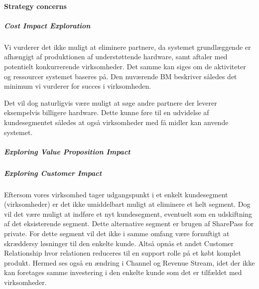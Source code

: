 \paragraph{Strategy concerns}

\subparagraph{Cost Impact Exploration}
Vi vurderer det ikke muligt at eliminere partnere, da systemet grundlæggende er afhængigt af produktionen af understøttende hardware, samt aftaler med potentielt konkurrerende virksomheder.
Det samme kan siges om de aktiviteter og ressourcer systemet baseres på.
Den nuværende BM beskriver således det minimum vi vurderer for succes i virksomheden.

Det vil dog naturligvis være muligt at søge andre partnere der leverer eksempelvis billigere hardware.
Dette kunne føre til en udvidelse af kundesegmentet således at også virksomheder med få midler kan anvende systemet.


\subparagraph{Exploring Value Proposition Impact}


\subparagraph{Exploring Customer Impact}
Eftersom vores virksomhed tager udgangspunkt i et enkelt kundesegment (virksomheder) er det ikke umiddelbart muligt at eliminere et helt segment.
Dog vil det være muligt at indføre et nyt kundesegment, eventuelt som en udskiftning af det eksisterende segment.
Dette alternative segment er brugen af SharePass for private.
For dette segment vil det ikke i samme omfang være fornuftigt at skræddersy løsninger til den enkelte kunde.
Altså opnås et andet Customer Relationship hvor relationen reduceres til en support rolle på et købt komplet produkt.
Hermed ses også en ændring i Channel og Revenue Stream, idet der ikke kan foretages samme investering i den enkelte kunde som det er tilfældet med virksomheder.

